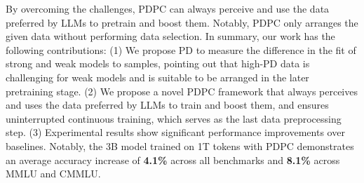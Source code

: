 \documentclass[11pt]{article}
\begin{document}




By overcoming the challenges, PDPC can always perceive and use the data preferred by LLMs to pretrain and boost them. Notably, PDPC only arranges the given data without performing data selection. In summary, our work has the following contributions:
(1) We propose PD to measure the difference in the fit of strong and weak models to samples, pointing out that high-PD data is challenging for weak models and is suitable to be arranged in the later pretraining stage.
(2) We propose a novel PDPC framework that always perceives and uses the data preferred by LLMs to train and boost them, and ensures uninterrupted continuous training, which serves as the last data preprocessing step.
(3) Experimental results show significant performance improvements over baselines. Notably, the 3B model trained on 1T tokens with PDPC demonstrates an average accuracy increase of \textbf{4.1\%} across all benchmarks and \textbf{8.1\%} across MMLU and CMMLU.
\end{document}
